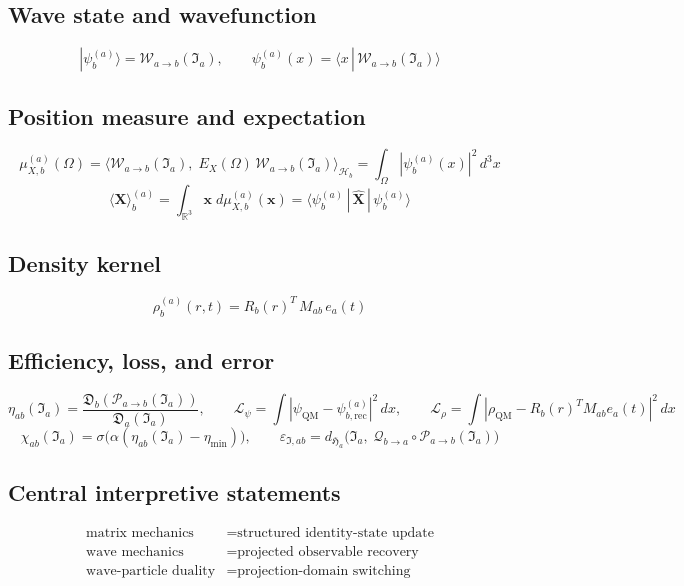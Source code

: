 \documentclass[12pt, a4paper]{article}
\theoremstyle{definition}
\theoremstyle{plain}
\theoremstyle{remark}
\newcommand{\Ia}{\mathfrak{I}_a}
\newcommand{\Ha}{\mathfrak{H}_a}        %
\newcommand{\Hb}{\mathcal{H}_b}         %
\newcommand{\Pab}{\mathcal{P}_{a\to b}}
\newcommand{\Wab}{\mathcal{W}_{a\to b}}   %
\newcommand{\Qba}{\mathcal{Q}_{b\to a}}   %
\newcommand{\psix}{\psi_b^{(a)}(x)}
\newcommand{\psirec}{\psi_{b,\mathrm{rec}}^{(a)}}
\newcommand{\psiQM}{\psi_{\mathrm{QM}}}
\newcommand{\Xhat}{\hat{\mathbf{X}}}
\newcommand{\EX}{E_X}
\newcommand{\muX}{\mu_{X,b}^{(a)}}
\newcommand{\Xexp}{\langle\mathbf{X}\rangle_b^{(a)}}
\newcommand{\rhoab}{\rho_b^{(a)}}
\newcommand{\rhoQM}{\rho_{\mathrm{QM}}}
\newcommand{\Dista}{\mathfrak{D}_a}
\newcommand{\Distb}{\mathfrak{D}_b}
\newcommand{\chiab}{\chi_{ab}}
\newcommand{\etaab}{\eta_{ab}}
\newcommand{\etamin}{\eta_{\min}}
\newcommand{\epsI}{\varepsilon_{\mathfrak{I},ab}}
\newcommand{\dHa}{d_{\Ha}}
\newcommand{\Lpsi}{\mathcal{L}_\psi}
\newcommand{\Lrho}{\mathcal{L}_\rho}
\newcommand{\Rbvec}{R_b(r)}
\newcommand{\eavec}{e_a(t)}
\newcommand{\Mab}{M_{ab}}
\begin{document}
\subsection*{Wave state and wavefunction}
\[
  |\psi_b^{(a)}\rangle = \Wab(\Ia),
  \qquad
  \psix = \langle x\,|\,\Wab(\Ia)\rangle
\]

\subsection*{Position measure and expectation}
\[
  \muX(\Omega)
  = \langle \Wab(\Ia),\;\EX(\Omega)\,\Wab(\Ia)\rangle_{\Hb}
  = \int_\Omega |\psix|^2\,d^3x
\]
\[
  \Xexp = \int_{\mathbb{R}^3} \mathbf{x}\;d\muX(\mathbf{x})
  = \langle\psi_b^{(a)}\,|\,\Xhat\,|\,\psi_b^{(a)}\rangle
\]

\subsection*{Density kernel}
\[
  \rhoab(r,t) = \Rbvec^T\,\Mab\,\eavec
\]

\subsection*{Efficiency, loss, and error}
\[
  \etaab(\Ia) = \frac{\Distb(\Pab(\Ia))}{\Dista(\Ia)},
  \qquad
  \Lpsi = \int |\psiQM - \psirec|^2\,dx,
  \qquad
  \Lrho = \int |\rhoQM - \Rbvec^T\Mab\eavec|^2\,dx
\]
\[
  \chiab(\Ia) = \sigma\!\bigl(\alpha(\etaab(\Ia)-\etamin)\bigr),
  \qquad
  \epsI = \dHa\!\bigl(\Ia,\;\Qba\circ\Pab(\Ia)\bigr)
\]

\subsection*{Central interpretive statements}
\begin{align*}
  \text{matrix mechanics}      &= \text{structured identity-state update} \\
  \text{wave mechanics}        &= \text{projected observable recovery} \\
  \text{wave-particle duality} &= \text{projection-domain switching}
\end{align*}

\bigskip
\end{document}
